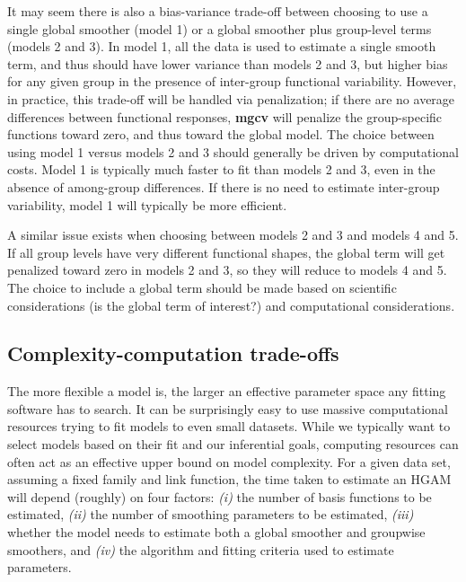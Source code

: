 \documentclass[12pt]{article}
\begin{document}
It may seem there is also a bias-variance trade-off between choosing to
use a single global smoother (model 1) or a global smoother plus
group-level terms (models 2 and 3). In model 1, all the data is used to
estimate a single smooth term, and thus should have lower variance than
models 2 and 3, but higher bias for any given group in the presence of
inter-group functional variability. However, in practice, this trade-off
will be handled via penalization; if there are no average differences
between functional responses, \textbf{mgcv} will penalize the
group-specific functions toward zero, and thus toward the global model.
The choice between using model 1 versus models 2 and 3 should generally
be driven by computational costs. Model 1 is typically much faster to
fit than models 2 and 3, even in the absence of among-group differences.
If there is no need to estimate inter-group variability, model 1 will
typically be more efficient.

A similar issue exists when choosing between models 2 and 3 and models 4
and 5. If all group levels have very different functional shapes, the
global term will get penalized toward zero in models 2 and 3, so they
will reduce to models 4 and 5. The choice to include a global term
should be made based on scientific considerations (is the global term of
interest?) and computational considerations.

\subsection{Complexity-computation
trade-offs}\label{complexity-computation-trade-offs}

The more flexible a model is, the larger an effective parameter space
any fitting software has to search. It can be surprisingly easy to use
massive computational resources trying to fit models to even small
datasets. While we typically want to select models based on their fit
and our inferential goals, computing resources can often act as an
effective upper bound on model complexity. For a given data set,
assuming a fixed family and link function, the time taken to estimate an
HGAM will depend (roughly) on four factors: \emph{(i)} the number of
basis functions to be estimated, \emph{(ii)} the number of smoothing
parameters to be estimated, \emph{(iii)} whether the model needs to
estimate both a global smoother and groupwise smoothers, and \emph{(iv)}
the algorithm and fitting criteria used to estimate parameters.
\end{document}
